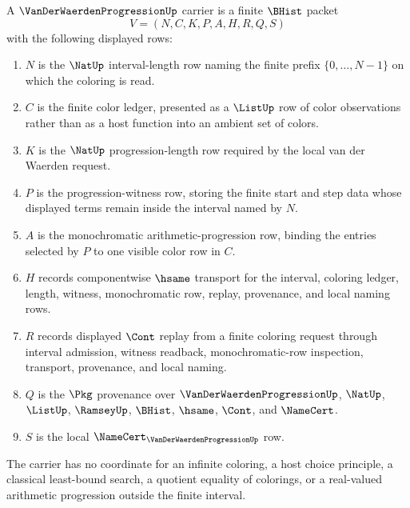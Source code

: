 \begin{definition}
\label{def:van-der-waerden-progression-carrier}
A $\VanDerWaerdenProgressionUp$ carrier is a finite $\BHist$ packet
$$
V=(N,C,K,P,A,H,R,Q,S)
$$
with the following displayed rows:
\begin{enumerate}
\item $N$ is the $\NatUp$ interval-length row naming the finite prefix $\{0,\ldots,N-1\}$ on which the coloring is read.
\item $C$ is the finite color ledger, presented as a $\ListUp$ row of color observations rather than as a host function into an ambient set of colors.
\item $K$ is the $\NatUp$ progression-length row required by the local van der Waerden request.
\item $P$ is the progression-witness row, storing the finite start and step data whose displayed terms remain inside the interval named by $N$.
\item $A$ is the monochromatic arithmetic-progression row, binding the entries selected by $P$ to one visible color row in $C$.
\item $H$ records componentwise $\hsame$ transport for the interval, coloring ledger, length, witness, monochromatic row, replay, provenance, and local naming rows.
\item $R$ records displayed $\Cont$ replay from a finite coloring request through interval admission, witness readback, monochromatic-row inspection, transport, provenance, and local naming.
\item $Q$ is the $\Pkg$ provenance over $\VanDerWaerdenProgressionUp$, $\NatUp$, $\ListUp$, $\RamseyUp$, $\BHist$, $\hsame$, $\Cont$, and $\NameCert$.
\item $S$ is the local $\NameCert_{\VanDerWaerdenProgressionUp}$ row.
\end{enumerate}
The carrier has no coordinate for an infinite coloring, a host choice principle, a classical least-bound search, a quotient equality of colorings, or a real-valued arithmetic progression outside the finite interval.
\end{definition}

